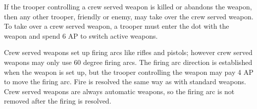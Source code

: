 If the trooper controlling a crew served weapon is killed or abandons the weapon, then any other trooper, friendly or enemy, may take over the crew served weapon.
To take over a crew served weapon, a trooper must enter the dot with the weapon and spend 6 AP to switch active weapons.

Crew served weapons set up firing arcs like rifles and pistols; however crew served weapons may only use 60 degree firing arcs.
The firing arc direction is established when the weapon is set up, but the trooper controlling the weapon may pay 4 AP to move the firing arc.
Fire is resolved the same way as with standard weapons.
Crew served weapons are always automatic weapons, so the firing arc is not removed after the firing is resolved.
